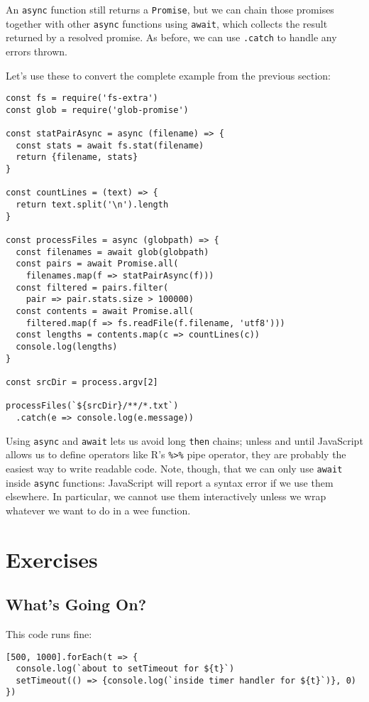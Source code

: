 An \texttt{async} function still returns a \texttt{Promise},
but we can chain those promises together with other \texttt{async} functions using \texttt{await},
which collects the result returned by a resolved promise.
As before, we can use \texttt{.catch} to handle any errors thrown.

Let's use these to convert the complete example from the previous section:

\begin{verbatim}
const fs = require('fs-extra')
const glob = require('glob-promise')

const statPairAsync = async (filename) => {
  const stats = await fs.stat(filename)
  return {filename, stats}
}

const countLines = (text) => {
  return text.split('\n').length
}

const processFiles = async (globpath) => {
  const filenames = await glob(globpath)
  const pairs = await Promise.all(
    filenames.map(f => statPairAsync(f)))
  const filtered = pairs.filter(
    pair => pair.stats.size > 100000)
  const contents = await Promise.all(
    filtered.map(f => fs.readFile(f.filename, 'utf8')))
  const lengths = contents.map(c => countLines(c))
  console.log(lengths)
}

const srcDir = process.argv[2]

processFiles(`${srcDir}/**/*.txt`)
  .catch(e => console.log(e.message))
\end{verbatim}

Using \texttt{async} and \texttt{await} lets us avoid long \texttt{then} chains;
unless and until JavaScript allows us to define operators like R's \texttt{\%\textgreater{}\%} pipe operator,
they are probably the easiest way to write readable code.
Note,
though,
that we can only use \texttt{await} inside \texttt{async} functions:
JavaScript will report a syntax error if we use them elsewhere.
In particular,
we cannot use them interactively unless we wrap whatever we want to do in a wee function.

\section{Exercises}\label{s:promises-exercises}

\subsection*{What's Going On?}
This code runs fine:

\begin{verbatim}
[500, 1000].forEach(t => {
  console.log(`about to setTimeout for ${t}`)
  setTimeout(() => {console.log(`inside timer handler for ${t}`)}, 0)
})
\end{verbatim}

